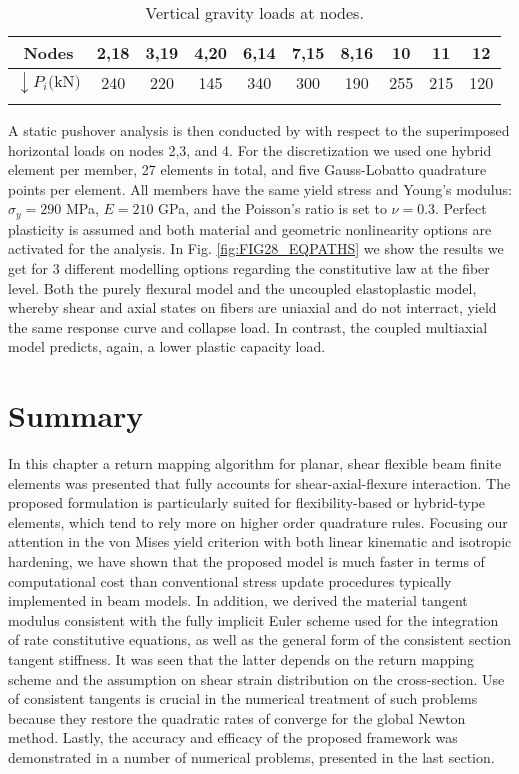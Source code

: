 \begin{table}[h]
	\centering
	\begin{minipage}{0.7\linewidth}
		\caption{Vertical gravity loads at nodes.}
		\begin{tabular}{cccccccccc}
			\toprule\toprule
			Nodes                         & 2,18 & 3,19 & 4,20& 6,14 & 7,15 & 
			8,16 & 10 & 11 & 12 \\
			\midrule
			$\downarrow P_i \text{(kN)}$  & 240  & 220  & 145 & 340 & 300 & 190 
			& 255 & 215 & 120 \\
			\bottomrule\bottomrule
			\label{table:TABLE10}
		\end{tabular}
	\end{minipage}
\end{table}

A static pushover analysis is then conducted by with respect to the 
superimposed horizontal loads on nodes 2,3, 
and 4. For the discretization we used one hybrid element per member, 27 
elements in 
total, and five Gauss-Lobatto quadrature points per element. All members have 
the same yield stress and Young's modulus: $\sigma_y = 290$ MPa, $E = 210$ GPa, 
and the Poisson's ratio is set to $\nu= 0.3$. Perfect plasticity is assumed and 
both material and geometric nonlinearity options are activated for the 
analysis. In Fig. \ref{fig:FIG28_EQPATHS} we show the results we get for 3 
different modelling 
options regarding the constitutive law at the fiber level. Both the purely 
flexural model and the uncoupled elastoplastic model, whereby shear and axial 
states on fibers are uniaxial and do not interract, yield the same response 
curve and collapse load. In contrast, the coupled multiaxial model predicts, 
again, a lower plastic capacity load. 


\section{Summary}

In this chapter a return mapping algorithm for planar, shear 
flexible beam finite elements was presented that fully accounts for 
shear-axial-flexure 
interaction. The proposed formulation is particularly suited for 
flexibility-based or 
hybrid-type elements, which tend to rely more on higher order quadrature rules. 
Focusing our attention in the von Mises yield criterion with both linear 
kinematic and 
isotropic hardening, we have shown that the proposed model is much faster in 
terms of computational cost than 
conventional stress update procedures typically implemented in beam models. In 
addition, we derived the material tangent modulus consistent with the fully 
implicit Euler scheme used for the integration of rate constitutive equations, 
as well as the general form of the consistent section tangent stiffness. It was 
seen that 
the latter depends on the return mapping scheme and the assumption on shear 
strain 
distribution on the cross-section. Use of consistent tangents is crucial in the 
numerical treatment of such problems because they restore the quadratic rates 
of 
converge for the global Newton method. Lastly, the accuracy and efficacy of the 
proposed 
framework was demonstrated in a number of numerical problems, presented in the 
last section. 